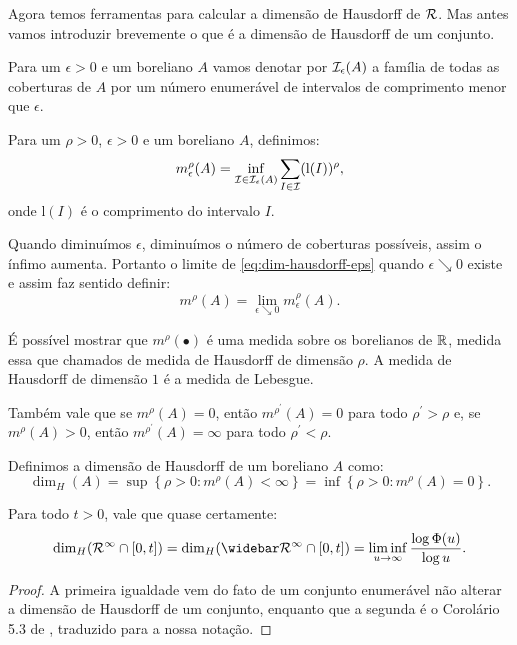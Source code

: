 Agora temos ferramentas para calcular a dimensão de Hausdorff de
${\mathcal{R}}$. Mas antes vamos introduzir brevemente o que é a dimensão de
Hausdorff de um conjunto.

Para um $\epsilon > 0$ e um boreliano $A$ vamos denotar por
${\mathcal{I}}_\epsilon(A)$ a família de todas as coberturas de $A$ por um
número enumerável de intervalos de comprimento menor que $\epsilon$.


Para um $\rho > 0$, $\epsilon > 0$ e um boreliano $A$, definimos:
\begin{equation}
  \label{eq:dim-hausdorff-eps}
  m^\rho_\epsilon(A) = \inf_{{\mathcal{I}} \in {\mathcal{I}}_\epsilon(A)} 
  \sum_{I \in {\mathcal{I}}} (\mathrm{l}(I))^\rho, 
\end{equation}
onde  $\mathrm{l}(I)$ é o comprimento do intervalo $I$.

Quando diminuímos $\epsilon$, diminuímos o número de coberturas
possíveis, assim o ínfimo aumenta. Portanto o limite de
\eqref{eq:dim-hausdorff-eps} quando $\epsilon \searrow 0$ existe e
assim faz sentido definir:
\begin{displaymath}
  m^\rho(A) = \lim_{\epsilon \searrow 0} m^\rho_\epsilon (A).
\end{displaymath}

É possível mostrar que $m^\rho(\bullet)$ é uma medida sobre os
borelianos de ${\mathbb{R}}$, medida essa que chamados de medida de Hausdorff de
dimensão $\rho$.  A medida de Hausdorff de dimensão $1$ é a medida de
Lebesgue.

Também vale que se $m^\rho(A) = 0$, então $m^{\rho^\prime}(A) = 0$ para
todo $\rho^\prime > \rho$ e, se $m^\rho(A) > 0$, então $m^{\rho^\prime}(A)
= \infty$ para todo $\rho^\prime < \rho$.

\begin{definicao}
  Definimos a dimensão de Hausdorff de um boreliano $A$ como:
  \begin{displaymath}
    \dim_H(A) = \sup \left\{ \rho > 0 : m^\rho(A) < \infty \right\}
    = \inf \left\{ \rho > 0: m^\rho(A) = 0 \right\}.
  \end{displaymath}
\end{definicao}

\begin{teorema}
  \label{teo:dim-hausdorff}
  Para todo $t > 0$, vale que quase certamente:
  \begin{equation}
    \label{eq:dim-hausdorff}
    \dim_H(\RR^\infty \cap [0, t]) = 
    \dim_H(\RRb^\infty \cap [0, t]) =
    \liminf_{u \to \infty} \frac{\log \Phi(u)}{\log u}.
  \end{equation}
\end{teorema}
\begin{proof}
  A primeira igualdade vem do fato de um conjunto enumerável não
  alterar a dimensão de Hausdorff de um conjunto, enquanto que a
  segunda é o Corolário 5.3 de \cite{bertoin:97}, traduzido para a
  nossa notação.
\end{proof}


